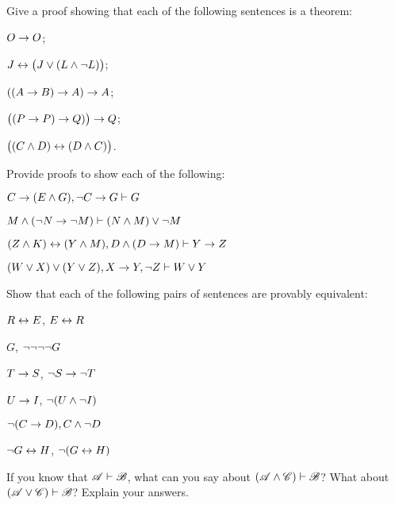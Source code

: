 
\practiceproblems
\problempart
Give a proof showing that each of the following sentences is a theorem:
\begin{earg}
\item $O \rightarrow O$;
\item $J \leftrightarrow \bigl(J\vee (L\wedge\neg L) \bigr)$;
\item $((A \rightarrow B) \rightarrow A) \rightarrow A$;
\item $\bigl((P \rightarrow P) \rightarrow Q)\bigr) \rightarrow Q$;
\item $\bigl((C \wedge D) \leftrightarrow (D \wedge C)\bigr)$.
\end{earg}

\problempart
Provide proofs to show each of the following:
\begin{earg}
\item $C\rightarrow(E\wedge G), \neg C \rightarrow G \vdash G$
\item $M \wedge (\neg N \rightarrow \neg M) \vdash (N \wedge M) \vee \neg M$
\item $(Z\wedge K)\leftrightarrow(Y\wedge M), D\wedge(D\rightarrow M) \vdash Y\rightarrow Z$
\item $(W \vee X) \vee (Y \vee Z), X\rightarrow Y, \neg Z \vdash W\vee Y$
\end{earg}

\problempart
Show that each of the following pairs of sentences are provably equivalent:
\begin{earg}
\item $R \leftrightarrow E$, $E \leftrightarrow R$
\item $G$, $\neg\neg\neg\neg G$
\item $T\rightarrow S$, $\neg S \rightarrow \neg T$
\item $U \rightarrow I$, $\neg(U \wedge \neg I)$
\item $\neg (C \rightarrow D), C \wedge \neg D$
\item $\neg G \leftrightarrow H$, $\neg(G \leftrightarrow H)$ 
\end{earg}

\problempart
If you know that $\mathscr{A}\vdash\mathscr{B}$, what can you say about $(\mathscr{A}\wedge\mathscr{C})\vdash\mathscr{B}$? What about $(\mathscr{A}\vee\mathscr{C})\vdash\mathscr{B}$? Explain your answers.


